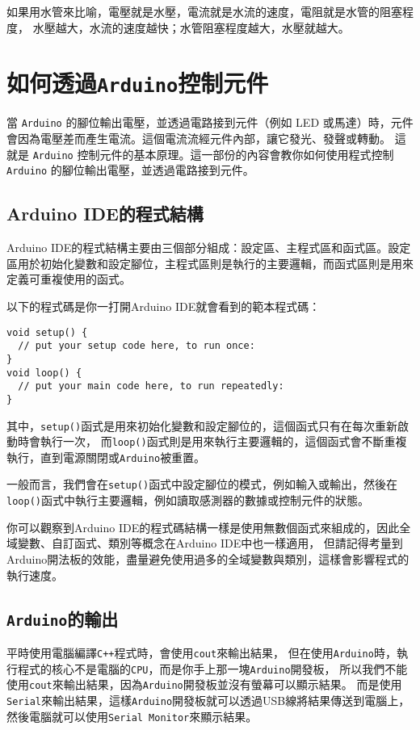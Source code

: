 \documentclass[12pt,a4paper]{article}
\begin{document}
如果用水管來比喻，電壓就是水壓，電流就是水流的速度，電阻就是水管的阻塞程度，
水壓越大，水流的速度越快；水管阻塞程度越大，水壓就越大。

\section{如何透過\texttt{Arduino}控制元件}

當 \texttt{Arduino} 的腳位輸出電壓，並透過電路接到元件（例如 LED 或馬達）時，元件會因為電壓差而產生電流。這個電流流經元件內部，讓它發光、發聲或轉動。
這就是 \texttt{Arduino} 控制元件的基本原理。這一部份的內容會教你如何使用程式控制 \texttt{Arduino} 的腳位輸出電壓，並透過電路接到元件。

\subsection{Arduino IDE的程式結構}
Arduino IDE的程式結構主要由三個部分組成：設定區、主程式區和函式區。設定區用於初始化變數和設定腳位，主程式區則是執行的主要邏輯，而函式區則是用來定義可重複使用的函式。

以下的程式碼是你一打開Arduino IDE就會看到的範本程式碼：
\begin{lstlisting}
void setup() {
  // put your setup code here, to run once:
}
void loop() {
  // put your main code here, to run repeatedly:
}
\end{lstlisting}

其中，\texttt{setup()}函式是用來初始化變數和設定腳位的，這個函式只有在每次重新啟動時會執行一次，
而\texttt{loop()}函式則是用來執行主要邏輯的，這個函式會不斷重複執行，直到電源關閉或\texttt{Arduino}被重置。

一般而言，我們會在\texttt{setup()}函式中設定腳位的模式，例如輸入或輸出，然後在\texttt{loop()}函式中執行主要邏輯，例如讀取感測器的數據或控制元件的狀態。

你可以觀察到Arduino IDE的程式碼結構一樣是使用無數個函式來組成的，因此全域變數、自訂函式、類別等概念在Arduino IDE中也一樣適用，
但請記得考量到Arduino開法板的效能，盡量避免使用過多的全域變數與類別，這樣會影響程式的執行速度。

\subsection{\texttt{Arduino}的輸出}
平時使用電腦編譯\texttt{C++}程式時，會使用\texttt{cout}來輸出結果，
但在使用\texttt{Arduino}時，執行程式的核心不是電腦的\texttt{CPU}，而是你手上那一塊\texttt{Arduino}開發板，
所以我們不能使用\texttt{cout}來輸出結果，因為\texttt{Arduino}開發板並沒有螢幕可以顯示結果。
而是使用\texttt{Serial}來輸出結果，這樣\texttt{Arduino}開發板就可以透過USB線將結果傳送到電腦上，
然後電腦就可以使用\texttt{Serial Monitor}來顯示結果。
\end{document}
